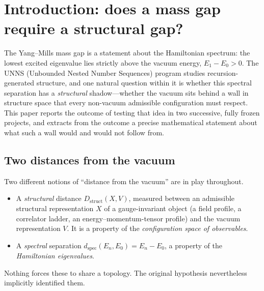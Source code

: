 \documentclass[11pt,a4paper]{article}
\theoremstyle{definition}
\theoremstyle{remark}
\newcommand{\Dstruct}{D_{\mathrm{struct}}}
\newcommand{\dspec}{d_{\mathrm{spec}}}
\newcommand{\uns}{UNNS}
\begin{document}
\section{Introduction: does a mass gap require a structural gap?}\label{sec:intro}

The Yang--Mills mass gap is a statement about the Hamiltonian spectrum: the lowest excited eigenvalue lies strictly above the vacuum energy, $E_1-E_0>0$. The \uns{} (Unbounded Nested Number Sequences) program studies recursion-generated structure, and one natural question within it is whether this spectral separation has a \emph{structural} shadow---whether the vacuum sits behind a wall in structure space that every non-vacuum admissible configuration must respect. This paper reports the outcome of testing that idea in two successive, fully frozen projects, and extracts from the outcome a precise mathematical statement about what such a wall would and would not follow from.

\subsection{Two distances from the vacuum}
Two different notions of ``distance from the vacuum'' are in play throughout.
\begin{itemize}
\item A \emph{structural} distance $\Dstruct(X,V)$, measured between an admissible structural representation $X$ of a gauge-invariant object (a field profile, a correlator ladder, an energy--momentum-tensor profile) and the vacuum representation $V$. It is a property of the \emph{configuration space of observables}.
\item A \emph{spectral} separation $\dspec(E_n,E_0)=E_n-E_0$, a property of the \emph{Hamiltonian eigenvalues}.
\end{itemize}
Nothing forces these to share a topology. The original hypothesis nevertheless implicitly identified them.
\end{document}
